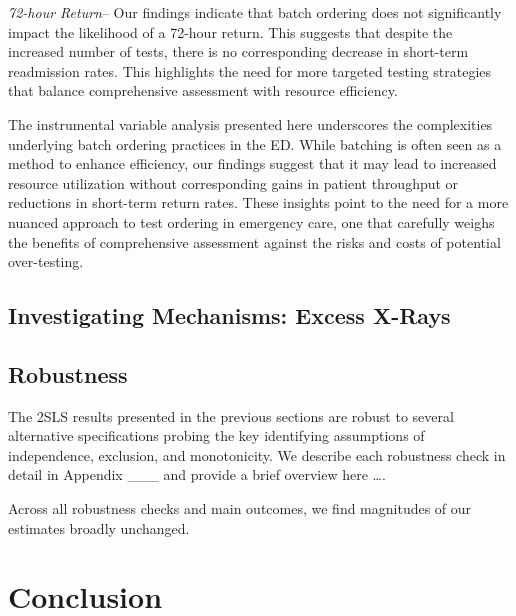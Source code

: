 \documentclass[,,nonblindrev]{informs}
\begin{document}
\emph{72-hour Return}-- Our findings indicate that batch ordering does
not significantly impact the likelihood of a 72-hour return. This
suggests that despite the increased number of tests, there is no
corresponding decrease in short-term readmission rates. This highlights
the need for more targeted testing strategies that balance comprehensive
assessment with resource efficiency.

The instrumental variable analysis presented here underscores the
complexities underlying batch ordering practices in the ED. While
batching is often seen as a method to enhance efficiency, our findings
suggest that it may lead to increased resource utilization without
corresponding gains in patient throughput or reductions in short-term
return rates. These insights point to the need for a more nuanced
approach to test ordering in emergency care, one that carefully weighs
the benefits of comprehensive assessment against the risks and costs of
potential over-testing.

\hypertarget{investigating-mechanisms-excess-x-rays}{%
\subsection{Investigating Mechanisms: Excess
X-Rays}\label{investigating-mechanisms-excess-x-rays}}

\hypertarget{robustness}{%
\subsection{Robustness}\label{robustness}}

The 2SLS results presented in the previous sections are robust to
several alternative specifications probing the key identifying
assumptions of independence, exclusion, and monotonicity. We describe
each robustness check in detail in Appendix \_\_\_ and provide a brief
overview here \ldots.

Across all robustness checks and main outcomes, we find magnitudes of
our estimates broadly unchanged.

\hypertarget{conclusion}{%
\section{Conclusion}\label{conclusion}}

\clearpage
\end{document}
